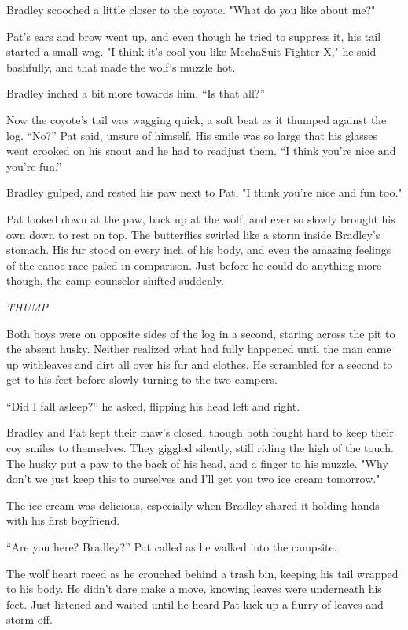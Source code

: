 Bradley scooched a little closer to the coyote. "What do you like about
me?"

Pat's ears and brow went up, and even though he tried to suppress it,
his tail started a small wag. "I think it's cool you like MechaSuit
Fighter X," he said bashfully, and that made the wolf's muzzle hot.

Bradley inched a bit more towards him. ``Is that all?''

Now the coyote's tail was wagging quick, a soft beat as it thumped
against the log. ``No?'' Pat said, unsure of himself. His smile was so
large that his glasses went crooked on his snout and he had to readjust
them. ``I think you're nice and you're fun.''

Bradley gulped, and rested his paw next to Pat. "I think you're nice and
fun too."

Pat looked down at the paw, back up at the wolf, and ever so slowly
brought his own down to rest on top. The butterflies swirled like a
storm inside Bradley's stomach. His fur stood on every inch of his body,
and even the amazing feelings of the canoe race paled in comparison.
Just before he could do anything more though, the camp counselor shifted
suddenly.

\emph{THUMP}

Both boys were on opposite sides of the log in a second, staring across
the pit to the absent husky. Neither realized what had fully happened
until the man came up withleaves and dirt all over his fur and clothes.
He scrambled for a second to get to his feet before slowly turning to
the two campers.

``Did I fall asleep?'' he asked, flipping his head left and right.

Bradley and Pat kept their maw's closed, though both fought hard to keep
their coy smiles to themselves. They giggled silently, still riding the
high of the touch. The husky put a paw to the back of his head, and a
finger to his muzzle. "Why don't we just keep this to ourselves and I'll
get you two ice cream tomorrow."

The ice cream was delicious, especially when Bradley shared it holding
hands with his first boyfriend.

``Are you here? Bradley?'' Pat called as he walked into the campsite.

The wolf heart raced as he crouched behind a trash bin, keeping his tail
wrapped to his body. He didn't dare make a move, knowing leaves were
underneath his feet. Just listened and waited until he heard Pat kick up
a flurry of leaves and storm off.

